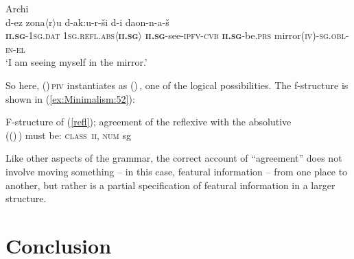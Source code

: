 \documentclass[output=paper,hidelinks]{langscibook}
\begin{document}
\ea\label{refl}Archi\\
\gll d-ez zona{$\scriptstyle\langle$}r{$\scriptstyle\rangle$}u d-ak:u-r-\v{s}i d-i
da{\textchi}on-n-a-\v{s}\\
{\bf\textsc{ii.sg}}\textsc{-1sg.dat}
\textsc{1sg.refl.abs}{$\scriptstyle\langle$}{\bf\textsc{ii.sg}}{$\scriptstyle\rangle$}
{\bf\textsc{ii.sg}}-see-\textsc{ipfv-cvb}
{\bf\textsc{ii.sg}}-be.\textsc{prs}
mirror\textsc{(iv)-sg.obl-in-el}\\
\glt `I am seeing myself in the mirror.'
\z


\largerpage[2]
So here, (\GF\UP)\,\textsc{piv} instantiates as
(\OBJ\UP)\,\OBJ, one of the logical possibilities. The
f-structure is shown in (\ref{ex:Minimalism:52}):

\vbox{
\ea\label{ex:Minimalism:52}
F-structure of (\ref{refl}); 
agreement of the reflexive with the absolutive\\
((\OBJ\UP)\,\OBJ) must be:
      \textsc{class\ ii, num} sg\\[0.5em]
\z
}
  
Like other aspects of the grammar, the correct account of
``agreement'' does not involve moving something -- in this case,
featural information -- from one place to another, but rather is a
partial specification of featural information in a larger structure.

\section{Conclusion}
\label{sec:minimalism:conclusion}
\end{document}

